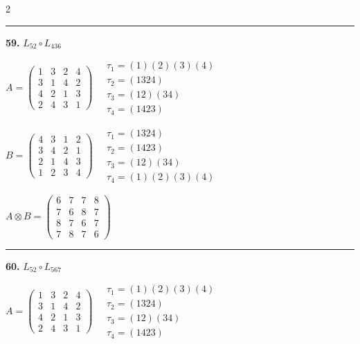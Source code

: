 \begin{multicols}{2}
\vspace{0.3em}
\hrule
\vspace{0.3em}

\noindent\textbf{59.} $L_{52} \circ L_{436}$

$A = \begin{pmatrix} 1 & 3 & 2 & 4 \\ 3 & 1 & 4 & 2 \\ 4 & 2 & 1 & 3 \\ 2 & 4 & 3 & 1 \end{pmatrix} \quad \begin{matrix} \tau_{1}=(1)(2)(3)(4) \\ \tau_{2}=(1 3 2 4) \\ \tau_{3}=(1 2)(3 4) \\ \tau_{4}=(1 4 2 3) \end{matrix}$

$B = \begin{pmatrix} 4 & 3 & 1 & 2 \\ 3 & 4 & 2 & 1 \\ 2 & 1 & 4 & 3 \\ 1 & 2 & 3 & 4 \end{pmatrix} \quad \begin{matrix} \tau_{1}=(1 3 2 4) \\ \tau_{2}=(1 4 2 3) \\ \tau_{3}=(1 2)(3 4) \\ \tau_{4}=(1)(2)(3)(4) \end{matrix}$

$A \otimes B = \begin{pmatrix} 6 & 7 & 7 & 8 \\ 7 & 6 & 8 & 7 \\ 8 & 7 & 6 & 7 \\ 7 & 8 & 7 & 6 \end{pmatrix}$

\vspace{0.3em}
\hrule
\vspace{0.3em}

\noindent\textbf{60.} $L_{52} \circ L_{567}$

$A = \begin{pmatrix} 1 & 3 & 2 & 4 \\ 3 & 1 & 4 & 2 \\ 4 & 2 & 1 & 3 \\ 2 & 4 & 3 & 1 \end{pmatrix} \quad \begin{matrix} \tau_{1}=(1)(2)(3)(4) \\ \tau_{2}=(1 3 2 4) \\ \tau_{3}=(1 2)(3 4) \\ \tau_{4}=(1 4 2 3) \end{matrix}$


\end{multicols}
